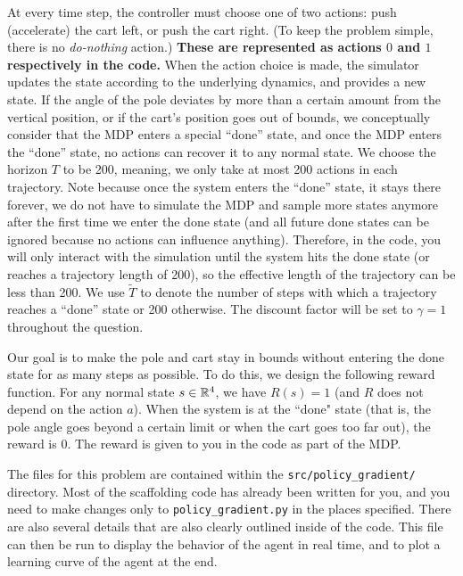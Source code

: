 \newcommand{\tilT}{\tilde{T}}
At every time step, the controller must choose one of two actions: push (accelerate) the cart left, or push the cart right. (To keep the problem simple, there is no {\it do-nothing} action.) \textbf{These are represented as actions $0$ and $1$ respectively in the code.}  When the action choice is made, the simulator updates the state according to the underlying dynamics, and provides a new state. 
If the angle of the pole deviates by more than a certain amount from the vertical position, or if the cart's position goes out of bounds, we conceptually consider that the MDP enters a special ``done'' state, and once the MDP enters the ``done'' state, no actions can recover it to any normal state. 
We choose the horizon $T$ to be 200, meaning, we only take at most 200 actions in each trajectory. Note because once the system enters the ``done'' state, it stays there forever, we do not have to simulate the MDP and sample more states anymore after the first time we enter the done state (and all future done states can be ignored because no actions can influence anything). Therefore, in the code, you will only interact with the simulation until the system hits the done state (or reaches a trajectory length of 200), so the effective length of the trajectory can be less than 200. We use $\tilT$ to denote the number of steps with which a trajectory reaches a ``done'' state or 200 otherwise. The discount factor will be set to $\gamma=1$ throughout the question. 


Our goal is to make the pole and cart stay in bounds without entering the done state for as many steps as possible. To do this, we design the following reward function.  For any normal state $s\in \mathbb{R}^4$, we have $R(s)=1$ (and $R$ does not depend on the action $a$). When the system is at the ``done" state (that is, the pole angle goes beyond a certain limit or when the cart goes too far out), the reward is 0. The reward is given to you in the code as part of the MDP. 

The files for this problem are contained within the \texttt{src/policy\_gradient/} directory. Most of the scaffolding code has already been written for you, and you need to make changes only to {\tt policy\_gradient.py} in the places specified. There are also several details that are also clearly outlined inside of the code. This file can then be run to display the behavior of the agent in real time, and to plot a learning curve of the agent at the end.

\begin{enumerate}

\ifnum{} {
  
} \fi


\ifnum{} {
  
} \fi


\ifnum{} {
  
} \fi
\end{enumerate}
